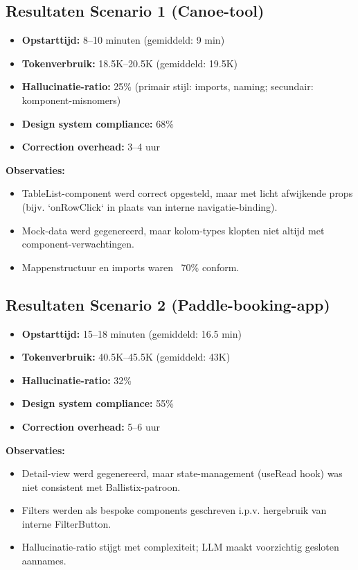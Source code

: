 \subsection{Resultaten Scenario 1 (Canoe-tool)}

\begin{itemize}
  \item \textbf{Opstarttijd:} 8--10 minuten (gemiddeld: 9 min)
  \item \textbf{Tokenverbruik:} 18.5K--20.5K (gemiddeld: 19.5K)
  \item \textbf{Hallucinatie-ratio:} 25\% (primair stijl: imports, naming; secundair: komponent-misnomers)
  \item \textbf{Design system compliance:} 68\%
  \item \textbf{Correction overhead:} 3--4 uur
\end{itemize}

\noindent
\textbf{Observaties:}
\begin{itemize}
  \item TableList-component werd correct opgesteld, maar met licht afwijkende props (bijv. `onRowClick` in plaats van interne navigatie-binding).
  \item Mock-data werd gegenereerd, maar kolom-types klopten niet altijd met component-verwachtingen.
  \item Mappenstructuur en imports waren ~70\% conform.
\end{itemize}

\subsection{Resultaten Scenario 2 (Paddle-booking-app)}

\begin{itemize}
  \item \textbf{Opstarttijd:} 15--18 minuten (gemiddeld: 16.5 min)
  \item \textbf{Tokenverbruik:} 40.5K--45.5K (gemiddeld: 43K)
  \item \textbf{Hallucinatie-ratio:} 32\%
  \item \textbf{Design system compliance:} 55\%
  \item \textbf{Correction overhead:} 5--6 uur
\end{itemize}

\noindent
\textbf{Observaties:}
\begin{itemize}
  \item Detail-view werd gegenereerd, maar state-management (useRead hook) was niet consistent met Ballistix-patroon.
  \item Filters werden als bespoke components geschreven i.p.v. hergebruik van interne FilterButton.
  \item Hallucinatie-ratio stijgt met complexiteit; LLM maakt voorzichtig gesloten aannames.
\end{itemize}

